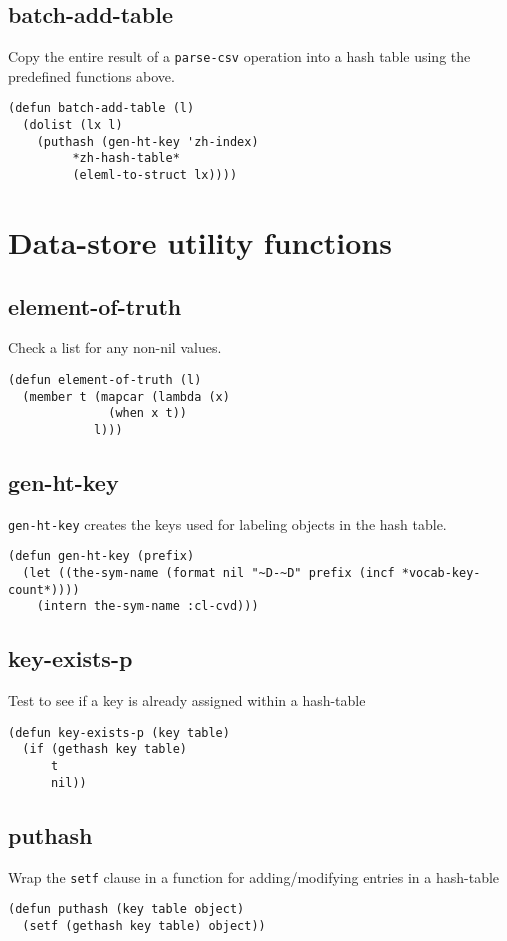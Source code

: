 \documentclass[11pt]{article}
\begin{document}
\subsection{batch-add-table}
\label{sec-3-10}
Copy the entire result of a \texttt{parse-csv} operation into a hash table using the
predefined functions above.
\begin{verbatim}
(defun batch-add-table (l)
  (dolist (lx l)
    (puthash (gen-ht-key 'zh-index)
	     *zh-hash-table*
	     (eleml-to-struct lx))))
\end{verbatim}
\section{Data-store utility functions}
\label{sec-4}
\subsection{element-of-truth}
\label{sec-4-1}
Check a list for any non-nil values.
\begin{verbatim}
(defun element-of-truth (l)
  (member t (mapcar (lambda (x)
		      (when x t))
		    l)))
\end{verbatim}
\subsection{gen-ht-key}
\label{sec-4-2}
\texttt{gen-ht-key} creates the keys used for labeling objects in the hash table.
\begin{verbatim}
(defun gen-ht-key (prefix)
  (let ((the-sym-name (format nil "~D-~D" prefix (incf *vocab-key-count*))))
    (intern the-sym-name :cl-cvd)))
\end{verbatim}
\subsection{key-exists-p}
\label{sec-4-3}
Test to see if a key is already assigned within a hash-table
\begin{verbatim}
(defun key-exists-p (key table)
  (if (gethash key table)
      t
      nil))
\end{verbatim}
\subsection{puthash}
\label{sec-4-4}
Wrap the \texttt{setf} clause in a function for adding/modifying entries in a hash-table
\begin{verbatim}
(defun puthash (key table object)
  (setf (gethash key table) object))
\end{verbatim}
\end{document}
